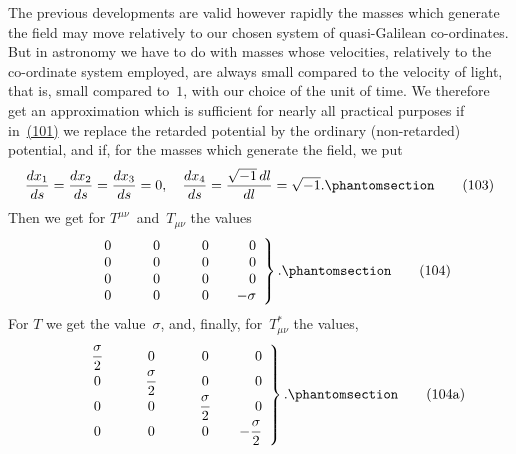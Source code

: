 \documentclass[12pt]{book}[2005/09/16]
\newcommand{\Change}[2]{#2}
\newcommand{\Add}[1]{\Change{}{#1}}
\newcommand{\PageSep}[1]{\ignorespaces}
\newcommand{\Tag}[1]{%
  \phantomsection
  \label{eqn:#1}
  \tag*{#1}
}
\newcommand{\Eqref}[1]{\hyperref[eqn:#1]{#1}}
\begin{document}
The previous developments are valid however rapidly
the masses which generate the field may move relatively
to our chosen system of quasi-Galilean co-ordinates. But
in astronomy we have to do with masses whose velocities,
relatively to the co-ordinate system employed, are always
small compared to the velocity of light, that is, small
compared to~$1$, with our choice of the unit of time.
We therefore get an approximation which is sufficient
for nearly all practical purposes if in~\Eqref{(101)} we replace
the retarded potential by the ordinary (non-retarded)
potential, and if, for the masses which generate the field,
we put
\[
\frac{dx_{1}}{ds} = \frac{dx_{2}}{ds} = \frac{dx_{3}}{ds} = 0,\quad
\frac{dx_{4}}{ds} = \frac{\sqrt{-1}\, dl}{dl} = \sqrt{-1}\Add{.}
\Tag{(\Change{103a}{103})}
\]
\PageSep{98}
Then we get for $T^{\mu\nu}$~and~$T_{\mu\nu}$ the values
\[
\left.
\begin{array}{*{3}{>{\qquad}r}>{\quad}r}
0 & 0 & 0 & 0 \\
0 & 0 & 0 & 0 \\
0 & 0 & 0 & 0 \\
0 & 0 & 0  & -\sigma
\end{array}
\right\}\Add{.}
\Tag{(104)}
\]
For $T$ we get the value~$\sigma$, and, finally, for~$T_{\mu\nu}^{*}$ the
values,
\[
\left.
\begin{array}{*{3}{>{\qquad}c}>{\quad}r}
\dfrac{\sigma}{2} & 0 & 0 & 0 \\
0 & \dfrac{\sigma}{2} & 0 & 0 \\
0 & 0 & \dfrac{\sigma}{2} & 0 \\
0 & 0 & 0  & -\dfrac{\sigma}{2}
\end{array}
\right\}\Add{.}
\Tag{(104a)}
\]
\end{document}

